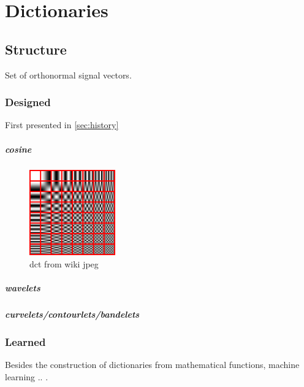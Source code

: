 \chapter{Dictionaries}

\section{Structure}
Set of orthonormal signal vectors.
\subsection{Designed}

First presented in \ref{sec:history}

\paragraph{cosine}
\begin{figure}
\includegraphics[width = 0.33\textwidth]{images/dct.png}
\caption{dct from wiki jpeg}
\label{fig:dct}
\end{figure}

\paragraph{wavelets}
\paragraph{curvelets/contourlets/bandelets}


\subsection{Learned}


Besides the construction of dictionaries from mathematical functions, machine learning .. .


